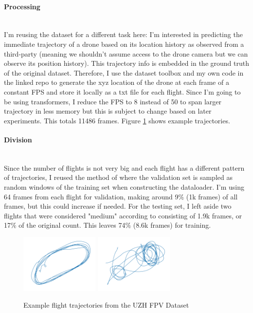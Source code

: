 \documentclass{article}
\begin{document}
\paragraph{Processing}$ $
\\I'm reusing the dataset for a different task here: I'm interested in predicting the immediate trajectory of a drone based on its location history as observed from a third-party (meaning we shouldn't assume access to the drone camera but we can observe its position history). This trajectory info is embedded in the ground truth of the original dataset. Therefore, I use the dataset toolbox and my own code in the linked repo to generate the xyz location of the drone at each frame of a constant FPS and store it locally as a txt file for each flight.  Since I'm going to be using transformers, I reduce the FPS to 8 instead of 50 to span larger trajectory in less memory but this is subject to change based on later experiments.  This totals 11486 frames.  Figure \ref{DatasetExamples} shows example trajectories.
\paragraph{Division}$ $
\\Since the number of flights is not very big and each flight has a different pattern of trajectories, I reused the method of \cite{giuliari2020transformer} where the validation set is sampled as random windows of the training set when constructing the dataloader. 
I'm using 64 frames from each flight for validation, making around 9\% (1k frames) of all frames, but this could increase if needed. For the testing set, I left aside two flights that were considered "medium" according to \citep{Delmerico19icra} consisting of 1.9k frames, or 17\% of the original count. This leaves 74\% (8.6k frames) for training.
\begin{figure}
    \centering
    \includegraphics[width=0.35\textwidth]{indoor_forward_3.png}
    \includegraphics[width=0.35\textwidth]{indoor_forward_7.png}  \\
    \caption{Example flight trajectories from the UZH FPV Dataset \cite{Delmerico19icra}}
    \label{DatasetExamples}
\end{figure}
\end{document}
